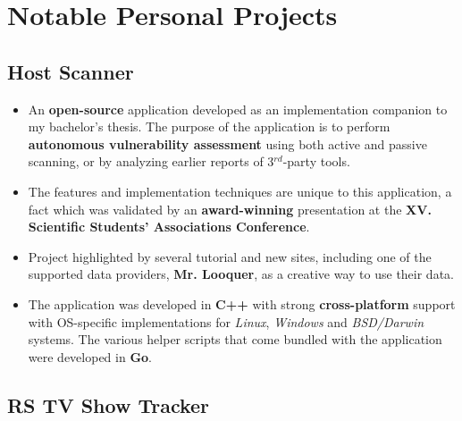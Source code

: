 \documentclass[11pt,a4paper,sans]{moderncv}
\begin{document}
\section{Notable Personal Projects}

	\subsection{Host Scanner}

	\begin{itemize}
		\item An \textbf{open-source} application developed as an implementation companion to my bachelor's thesis. The purpose of the application is to perform \textbf{autonomous vulnerability assessment} using both active and passive scanning, or by analyzing earlier reports of 3$^{rd}$-party tools.

		\item The features and implementation techniques are unique to this application, a fact which was validated by an \textbf{award-winning} presentation at the \textbf{XV. Scientific Students' Associations Conference}.

		\item Project highlighted by several tutorial and new sites, including one of the supported data providers, \textbf{Mr. Looquer}, as a creative way to use their data.

		\item The application was developed in \textbf{C++} with strong \textbf{cross-platform} support with OS-specific implementations for \textit{Linux}, \textit{Windows} and \textit{BSD/Darwin} systems. The various helper scripts that come bundled with the application were developed in \textbf{Go}.
	\end{itemize}

	\subsection{RS TV Show Tracker}
\end{document}
